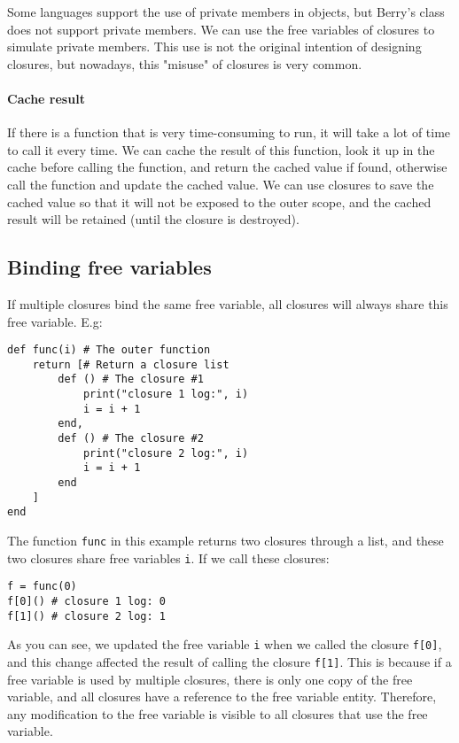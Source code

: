 Some languages   support the use of private members in objects, but Berry's class does not support private members. We can use the free variables of closures to simulate private members. This use is not the original intention of designing closures, but nowadays, this "misuse" of closures is very common.

\paragraph{Cache result}

If there is a function that is very time-consuming to run, it will take a lot of time to call it every time. We can cache the result of this function, look it up in the cache before calling the function, and return the cached value if found, otherwise call the function and update the cached value. We can use closures to save the cached value so that it will not be exposed to the outer scope, and the cached result will be retained (until the closure is destroyed).

\subsection {Binding free variables}If multiple closures bind the same free variable, all closures will always share this free variable. E.g:
\begin{lstlisting}[language=berry]
def func(i) # The outer function
    return [# Return a closure list
        def () # The closure #1
            print("closure 1 log:", i)
            i = i + 1
        end,
        def () # The closure #2
            print("closure 2 log:", i)
            i = i + 1
        end
    ]
end
\end{lstlisting}
The function \texttt{func} in this example returns two closures through a list, and these two closures share free variables \texttt{i}. If we call these closures:
\begin{lstlisting}[language=berry]
f = func(0)
f[0]() # closure 1 log: 0
f[1]() # closure 2 log: 1
\end{lstlisting}
As you can see, we updated the free variable \texttt{i} when we called the closure \texttt{f[0]}, and this change affected the result of calling the closure \texttt{f[1]}. This is because if a free variable is used by multiple closures, there is only one copy of the free variable, and all closures have a reference to the free variable entity. Therefore, any modification to the free variable is visible to all closures that use the free variable.

